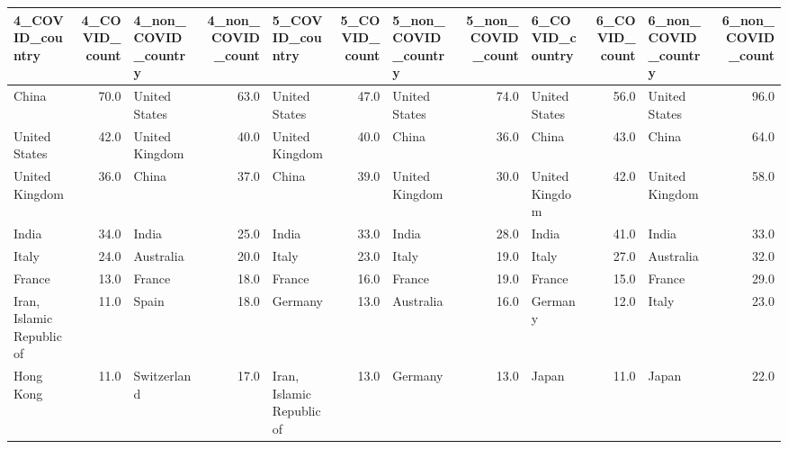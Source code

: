 \begin{tabular}{lrlrlrlrlrlr}
\toprule
           4\_COVID\_country &  4\_COVID\_count &        4\_non\_COVID\_country &  4\_non\_COVID\_count &            5\_COVID\_country &  5\_COVID\_count & 5\_non\_COVID\_country &  5\_non\_COVID\_count & 6\_COVID\_country &  6\_COVID\_count & 6\_non\_COVID\_country &  6\_non\_COVID\_count \\
\midrule
                     China &           70.0 &              United States &               63.0 &              United States &           47.0 &       United States &               74.0 &   United States &           56.0 &       United States &               96.0 \\
             United States &           42.0 &             United Kingdom &               40.0 &             United Kingdom &           40.0 &               China &               36.0 &           China &           43.0 &               China &               64.0 \\
            United Kingdom &           36.0 &                      China &               37.0 &                      China &           39.0 &      United Kingdom &               30.0 &  United Kingdom &           42.0 &      United Kingdom &               58.0 \\
                     India &           34.0 &                      India &               25.0 &                      India &           33.0 &               India &               28.0 &           India &           41.0 &               India &               33.0 \\
                     Italy &           24.0 &                  Australia &               20.0 &                      Italy &           23.0 &               Italy &               19.0 &           Italy &           27.0 &           Australia &               32.0 \\
                    France &           13.0 &                     France &               18.0 &                     France &           16.0 &              France &               19.0 &          France &           15.0 &              France &               29.0 \\
 Iran, Islamic Republic of &           11.0 &                      Spain &               18.0 &                    Germany &           13.0 &           Australia &               16.0 &         Germany &           12.0 &               Italy &               23.0 \\
                 Hong Kong &           11.0 &                Switzerland &               17.0 &  Iran, Islamic Republic of &           13.0 &             Germany &               13.0 &           Japan &           11.0 &               Japan &               22.0 \\

\end{tabular}
